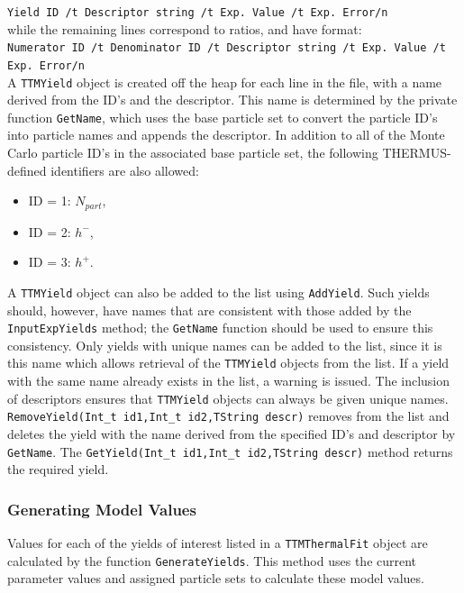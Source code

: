 \documentclass{elsarticle}
\begin{document}
\texttt{Yield ID /t Descriptor string /t Exp. Value /t Exp. Error/n}\\

\noindent
while the remaining lines correspond to ratios, and have format:\\

\texttt{Numerator ID /t Denominator ID /t Descriptor string /t Exp. Value /t Exp. Error/n}\\

\noindent
A \texttt{TTMYield} object is created off the heap for each line in the file, with a name derived from 
the ID's and the 
descriptor. This name is determined by the private function \texttt{GetName}, which uses the base particle set to convert the particle ID's into particle names and appends the descriptor. 
In addition to all of the Monte Carlo particle ID's in the associated base particle set, the following THERMUS-defined identifiers
are also allowed: 
\begin{itemize}
\item{ID = 1: $N_{part}$,} 
\item{ID = 2: $h^-$,}
\item{ID = 3: $h^+$.}
\end{itemize} 

A \texttt{TTMYield} object can also be added to the list using \texttt{AddYield}. Such yields should, however, have names that are consistent 
with those added by the \texttt{InputExpYields} method; the \texttt{GetName} function should be used to ensure this consistency. Only 
yields with unique names can be added to the list, since it is this name which allows retrieval of the \texttt{TTMYield} objects from the 
list. If a yield with the same name already exists in the list, a warning is 
issued. The inclusion of descriptors ensures that \texttt{TTMYield} objects can always be given unique names.\\
 
\texttt{RemoveYield(Int\_t id1,Int\_t id2,TString descr)} removes from the list and deletes the 
yield with the name derived from the specified ID's and descriptor by \texttt{GetName}. The \texttt{GetYield(Int\_t id1,Int\_t id2,TString descr)} method returns the required yield.\\

\subsubsection{Generating Model Values}

Values for each of the yields of interest listed in a \texttt{TTMThermalFit} object are calculated by the function \texttt{GenerateYields}. This method uses the current parameter values and assigned 
particle sets to calculate these model values.\\
\end{document}
